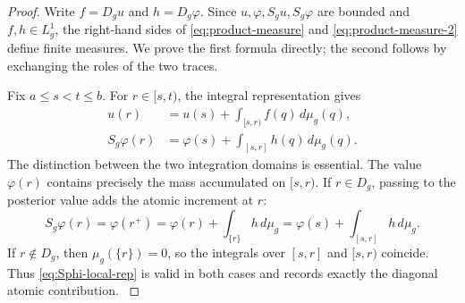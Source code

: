 \documentclass[preprint,12pt]{elsarticle}
\newenvironment{revision}{\begingroup\color{red}}{\endgroup}
\newenvironment{revision}{}{}
\theoremstyle{definition}
\theoremstyle{remark}
\newcommand{\mug}{\mu_g}
\begin{document}
\begin{proof}
Write $f=D_gu$ and $h=D_g\varphi$. Since $u,\varphi,S_gu,S_g\varphi$ are bounded and $f,h\in L_g^1$, the right-hand sides of \eqref{eq:product-measure} and \eqref{eq:product-measure-2} define finite measures. We prove the first formula directly; the second follows by exchanging the roles of the two traces.

Fix $a\le s<t\le b$. For $r\in[s,t)$, the integral representation gives
\begin{align}
 u(r)&=u(s)+\int_{[s,r)}f(q)\,d\mug(q),\label{eq:u-local-rep}\\
 S_g\varphi(r)&=\varphi(s)+\int_{[s,r]}h(q)\,d\mug(q).
 \label{eq:Sphi-local-rep}
\end{align}
 \begin{revision}
 The distinction between the two integration domains is essential.  The value
 \(\varphi(r)\) contains precisely the mass accumulated on \([s,r)\).  If
 \(r\in D_g\), passing to the posterior value adds the atomic increment at
 \(r\):
 \[
  S_g\varphi(r)=\varphi(r^+)
  =\varphi(r)+\int_{\{r\}}h\,d\mu_g
  =\varphi(s)+\int_{[s,r]}h\,d\mu_g.
 \]
 If \(r\notin D_g\), then \(\mu_g(\{r\})=0\), so the integrals over
 \([s,r]\) and \([s,r)\) coincide.  Thus
 \eqref{eq:Sphi-local-rep} is valid in both cases and records exactly the
 diagonal atomic contribution.
 \end{revision}


\end{proof}
\end{document}
